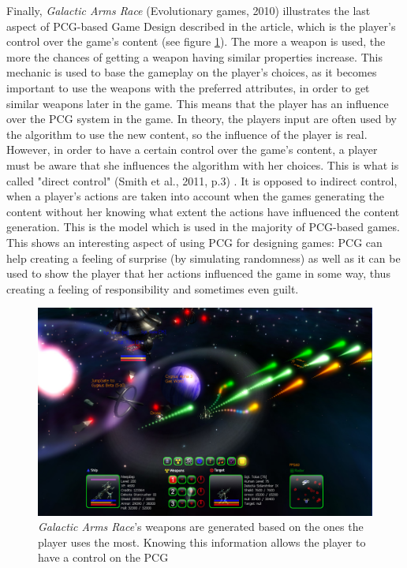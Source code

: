 Finally, \textit{Galactic Arms Race} (Evolutionary games, 2010) \cite{game:gar} illustrates the last aspect of PCG-based Game Design described in the article, which is the player's control over the game's content (see figure \ref{fig:GAR}). The more a weapon is used, the more the chances of getting a weapon having similar properties increase. This mechanic is used to base the gameplay on the player's choices, as it becomes important to use the weapons with the preferred attributes, in order to get similar weapons later in the game. This means that the player has an influence over the PCG system in the game. In theory, the players input are often used by the algorithm to use the new content, so the influence of the player is real. However, in order to have a certain control over the game's content, a player must be aware that she influences the algorithm with her choices. This is what is called "direct control" (Smith et al., 2011, p.3) \cite{pdf:pcgbased}. It is opposed to indirect control, when a player's actions are taken into account when the games generating the content without her knowing what extent the actions have influenced the content generation. This is the model which is used in the majority of PCG-based games. This shows an interesting aspect of using PCG for designing games: PCG can help creating a feeling of surprise (by simulating randomness) as well as it can be used to show the player that her actions influenced the game in some way, thus creating a feeling of responsibility and sometimes even guilt.

\begin{figure}[!ht]
    \centering
    \includegraphics[scale=0.2]{Images/GAR.jpg}
    \caption{\textit{Galactic Arms Race}'s weapons are generated based on the ones the player uses the most. Knowing this information allows the player to have a control on the PCG}
    \label{fig:GAR}
\end{figure}

